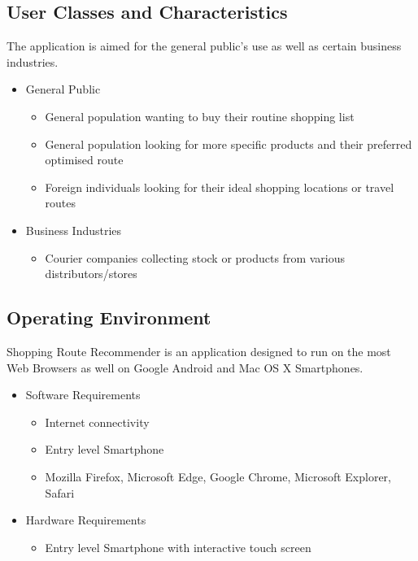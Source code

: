 \documentclass[10pt, a4paper, onecolumn]{scrartcl}
\begin{document}
		\subsection{User Classes and Characteristics}
		
			The application is aimed for the general public's use as well as certain business industries. 
			
			\begin{itemize}
				\item General Public
				\begin{itemize}
					\item General population wanting to buy their routine shopping list
					\item General population looking for more specific products and their preferred optimised route
					\item Foreign individuals looking for their ideal shopping locations or travel routes
				\end{itemize}
				\item Business Industries
				\begin{itemize}
					\item Courier companies collecting stock or products from various distributors/stores
				\end{itemize}
			\end{itemize}
		
		\subsection{Operating Environment}
		
			Shopping Route Recommender is an application designed to run on the most Web Browsers as well on Google Android and Mac OS X Smartphones. 
			
			\begin{itemize}
				\item Software Requirements
				\begin{itemize}
					\item Internet connectivity
					\item Entry level Smartphone
					\item Mozilla Firefox, Microsoft Edge, Google Chrome, Microsoft Explorer, Safari
				\end{itemize}
				\item Hardware Requirements
				\begin{itemize}
					\item Entry level Smartphone with interactive touch screen
				\end{itemize}
			\end{itemize}
		
\end{document}
